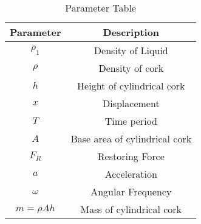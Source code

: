 \begin{table}[ht]
  \centering
    \begin{tabular}{|c|c|}
        \hline
	   \textbf{ Parameter} & \textbf{Description} \\
	        \hline
		     $\rho_1$ & Density of Liquid \\
		          \hline
			       $\rho$ & Density of cork \\
			            \hline
				         $h$ & Height of cylindrical cork \\
					      \hline
					           $x$ & Displacement \\
						        \hline
							    $T$ & Time period \\
							        \hline
								    $A$ & Base area of cylindrical cork \\
								        \hline
									    $F_R$ & Restoring Force \\
									        \hline
										    $a$ & Acceleration \\
										        \hline
											    $\omega$ & Angular Frequency \\
											        \hline
												    $m = \rho Ah$ & Mass of cylindrical cork \\
												        \hline
													  \end{tabular}
													    \vspace{2mm}
													      \caption{Parameter Table}
													        \label{11.14.18}
														\end{table}
